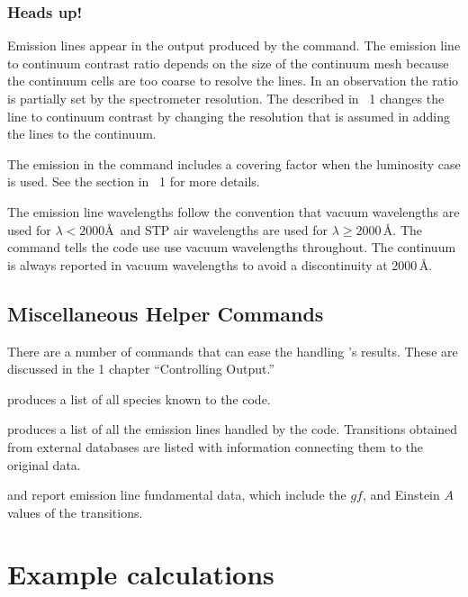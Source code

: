\documentclass[12pt,twoside]{article}
\begin{document}
{\subsubsection{Heads up!}

Emission lines appear in the output produced by the
 command.
The emission line to continuum contrast ratio depends on the size
of the continuum mesh because the continuum cells are too coarse to resolve
the lines.  
In an observation the ratio is partially set by the spectrometer resolution.
The  described in \Hazy\ 1 changes the 
line to continuum contrast by changing the
resolution that is assumed in adding the lines to the continuum.  

The emission in the  command includes
a covering factor when the luminosity case is used.  
See the section  in \Hazy\ 1 for more details.

The emission line wavelengths follow the convention that vacuum wavelengths
are used for $\lambda < 2000$\AA\ and STP air wavelengths are used
for $\lambda \ge 2000$\,\AA.
The  command tells the code use use vacuum wavelengths throughout.
The continuum is always reported in vacuum wavelengths to avoid 
a discontinuity at 2000\,\AA.

\subsection{Miscellaneous Helper Commands}
\label{sec:MiscHelperCommands}

There are a number of commands that can ease the handling \Cloudy's results.
These are discussed in the \Hazy{} 1 chapter ``Controlling Output.'' 

 produces a list of all species
known to the code.

 produces a list of all the emission lines
handled by the code.  Transitions obtained from external databases are
listed with information connecting them to the original data.

 and  report
emission line fundamental data, which include the $gf$, and Einstein
$A$ values of the transitions.

\section{Example calculations}
\label{sec:ExampleCalculations}

}
\end{document}
